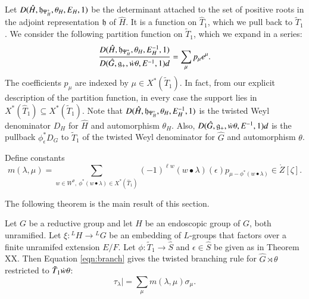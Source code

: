 Let $D(\hat H,{\mathfrak h}_{\Psi^+_H},\theta_H,E_H,1)$ be the determinant attached to the set of positive roots in the adjoint representation ${\mathfrak h}$ of  $\hat H$.
It is a function on $\hat T_1$, which we pull back to $\tilde T_1$.  We consider the following partition function on $\tilde T_1$, which we expand
in a series:
\begin{equation}
\frac{D(\hat H,{\mathfrak h}_{\Psi^+_H},\theta_H,E^{-1}_H,1)}{D(\hat G,{\mathfrak g}_{+},\dot w\theta,E^{-1},1) d} = \sum_\mu p_\mu e^\mu.
\end{equation}
The coefficients $p_\mu$ are indexed by $\mu\in X^*(\tilde T_1)$.  In fact, from our explicit description of the partition
function, in every case the support lies in $X^*(\hat T_1)\subseteq X^*(\tilde T_1)$.
Note that
${D(\hat H,{\mathfrak h}_{\Psi^+_H},\theta_H,E^{-1}_H,1)}$ is the twisted Weyl denominator $D_H$ for $\hat H$ and automorphism $\theta_H$.
Also,
${D(\hat G,{\mathfrak g}_{+},\dot w\theta,E^{-1},1) d}$ is the pullback $\phi^*_\epsilon D_G$ to $\tilde T_1$ of the twisted Weyl denominator  for $\hat G$ and
automorphism $\theta$.


Define constants 
\begin{equation}\label{eqn:branch}
m(\lambda,\mu) = \sum_{w\in W^\theta, ~\phi^*({w\bullet\lambda})\in  X^*(\hat T_1)} (-1)^{\ell w} ({w\bullet\lambda})(\epsilon)
p_{\mu-\phi^*(w\bullet\lambda)} \in \ring{Z}[\zeta].
\end{equation}

The following theorem is the main result of this section.

\begin{theorem}\label{thm:branch}
Let $G$ be a reductive group and let $H$ be an endoscopic group of $G$, both unramified.
Let $\xi:{}^LH\to {}^LG$ be an embedding of $L$-groups that factors over a finite
unramifed extension $E/F$.  Let $\phi:\tilde T_1\to \hat S$ and $\epsilon\in\hat S$ be given
as in Theorem XX.
Then Equation \ref{eqn:branch} gives the twisted branching rule for $\hat G\rtimes \theta$ restricted to $\tilde T_1\dot w\theta$:
\[
\tau_\lambda| = \sum_\mu m(\lambda,\mu) \sigma_\mu.
\]
\end{theorem}

